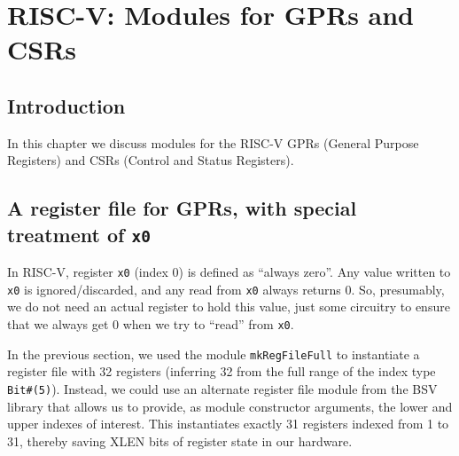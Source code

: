 

\chapter{RISC-V: Modules for GPRs and CSRs}


\setcounter{page}{1}
\renewcommand{\thepage}{\arabic{chapter}-\arabic{page}}

\label{ch_GPRs_and_CSRs}


\section{Introduction}

In this chapter we discuss modules for the RISC-V GPRs (General
Purpose Registers) and CSRs (Control and Status Registers).


\section{A register file for GPRs, with special treatment of {\tt x0}}

\label{Sec_RISCV_regfile}


In RISC-V, register \verb|x0| (index 0) is defined as ``always zero''.
Any value written to \verb|x0| is ignored/discarded, and any read from
\verb|x0| always returns 0.  So, presumably, we do not need an actual
register to hold this value, just some circuitry to ensure that we
always get 0 when we try to ``read'' from \verb|x0|.

In the previous section, we used the module \verb|mkRegFileFull| to
instantiate a register file with 32 registers (inferring 32 from the
full range of the index type \verb|Bit#(5)|).  Instead, we could use
an alternate register file module from the BSV library that allows us
to provide, as module constructor arguments, the lower and upper
indexes of interest.  This instantiates exactly 31 registers indexed
from 1 to 31, thereby saving XLEN bits of register state in our
hardware.

